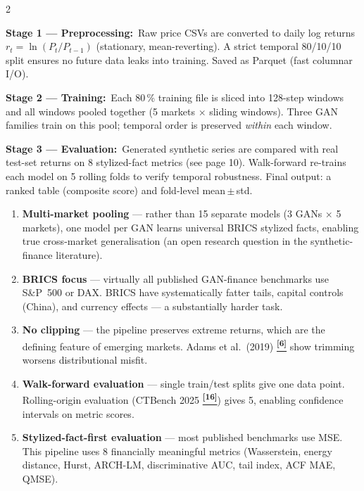 \documentclass[10pt]{article}
\newcommand{\navybox}[2]{\begin{tcolorbox}[mybox={Navy}{LBg},title={#1}]#2\end{tcolorbox}}
\newcommand{\skybox}[2]{\begin{tcolorbox}[mybox={Sky}{BBg},title={#1}]#2\end{tcolorbox}}
\newcommand{\tcite}[1]{%
  \hyperlink{R:#1}{\textsuperscript{\scriptsize\textbf{[#1]}}}}
\begin{document}
\vspace{6pt}
\begin{multicols}{2}

\navybox{What Each Stage Does}{%
\textbf{Stage 1 — Preprocessing:}\ Raw price CSVs are converted to daily log returns
$r_t = \ln(P_t/P_{t-1})$ (stationary, mean-reverting). A strict temporal 80/10/10 split ensures no future data leaks into training. Saved as Parquet (fast columnar I/O).

\smallskip
\textbf{Stage 2 — Training:}\ Each 80\,\% training file is sliced into 128-step windows and all windows pooled together (5 markets $\times$ sliding windows). Three GAN families train on this pool; temporal order is preserved \emph{within} each window.

\smallskip
\textbf{Stage 3 — Evaluation:}\ Generated synthetic series are compared with real test-set returns on 8 stylized-fact metrics (see page 10). Walk-forward re-trains each model on 5 rolling folds to verify temporal robustness. Final output: a ranked table (composite score) and fold-level mean\,$\pm$\,std.}

\skybox{What Makes This Pipeline Scientifically Novel}{%
\begin{enumerate}
  \item \textbf{Multi-market pooling} --- rather than 15 separate models (3 GANs $\times$ 5 markets), one model per GAN learns universal BRICS stylized facts, enabling true cross-market generalisation (an open research question in the synthetic-finance literature).
  \item \textbf{BRICS focus} --- virtually all published GAN-finance benchmarks use S\&P~500 or DAX. BRICS have systematically fatter tails, capital controls (China), and currency effects --- a substantially harder task.
  \item \textbf{No clipping} --- the pipeline preserves extreme returns, which are the defining feature of emerging markets. Adams et al.\ (2019)\tcite{6} show trimming worsens distributional misfit.
  \item \textbf{Walk-forward evaluation} --- single train/test splits give one data point. Rolling-origin evaluation (CTBench 2025\tcite{16}) gives 5, enabling confidence intervals on metric scores.
  \item \textbf{Stylized-fact-first evaluation} --- most published benchmarks use MSE. This pipeline uses 8 financially meaningful metrics (Wasserstein, energy distance, Hurst, ARCH-LM, discriminative AUC, tail index, ACF MAE, QMSE).
\end{enumerate}}


\end{multicols}
\end{document}

